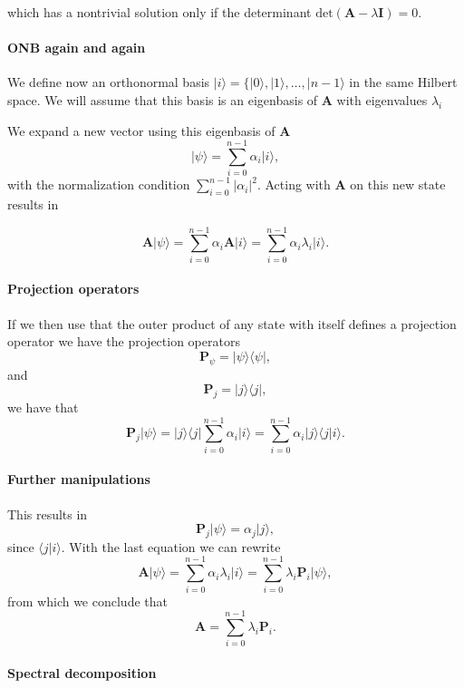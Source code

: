 which has a nontrivial solution only if the determinant
$\mathrm{det}(\bm{A}-\lambda\bm{I})=0$.


\paragraph{ONB again and again}

We define now an orthonormal basis $\vert i \rangle =\{\vert 0
\rangle, \vert 1\rangle, \dots, \vert n-1\rangle$ in the same Hilbert
space. We will assume that this basis is an eigenbasis of $\bm{A}$ with eigenvalues $\lambda_i$

We expand a new vector using this eigenbasis of $\bm{A}$
\[
\vert \psi \rangle = \sum_{i=0}^{n-1}\alpha_i\vert i\rangle,
\]
with the normalization condition $\sum_{i=0}^{n-1}\vert \alpha_i\vert^2$.
Acting with $\bm{A}$ on this new state results in

\[
\bm{A}\vert \psi \rangle = \sum_{i=0}^{n-1}\alpha_i\bm{A}\vert i\rangle=\sum_{i=0}^{n-1}\alpha_i\lambda_i\vert i\rangle.
\]


\paragraph{Projection operators}

If we then use that the outer product of any state with itself defines a projection operator we have the projection operators
\[
\bm{P}_{\psi} = \vert \psi\rangle\langle \psi\vert,
\]
and
\[
\bm{P}_{j} = \vert j\rangle\langle j\vert,
\]
we have that 
\[
\bm{P}_{j}\vert \psi\rangle=\vert j\rangle\langle j\vert\sum_{i=0}^{n-1}\alpha_i\vert i\rangle=\sum_{i=0}^{n-1}\alpha_i\vert j\rangle\langle j\vert i\rangle.
\]


\paragraph{Further manipulations}

This results in
\[
\bm{P}_{j}\vert \psi\rangle=\alpha_j\vert j\rangle,
\]
since $\langle j\vert i\rangle$.
With the last equation we can rewrite
\[
\bm{A}\vert \psi \rangle = \sum_{i=0}^{n-1}\alpha_i\lambda_i\vert i\rangle=\sum_{i=0}^{n-1}\lambda_i\bm{P}_i\vert \psi\rangle,
\]
from which we conclude that
\[
\bm{A}=\sum_{i=0}^{n-1}\lambda_i\bm{P}_i.
\]


\paragraph{Spectral decomposition}


